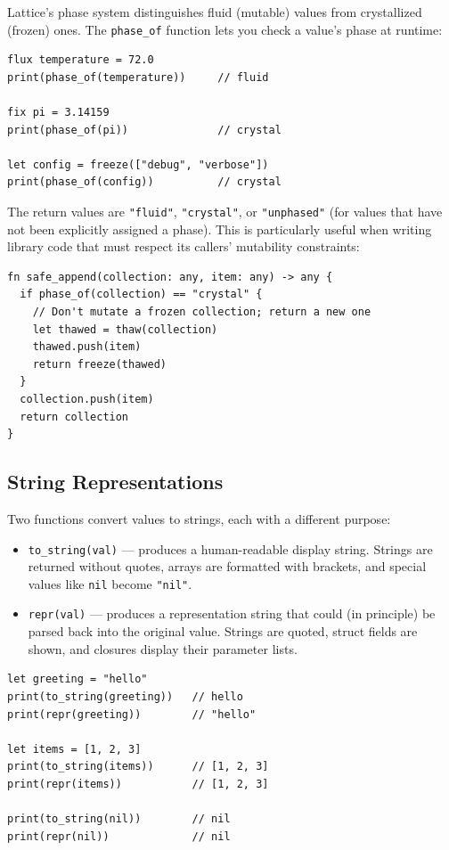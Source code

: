 Lattice's phase system distinguishes fluid (mutable) values from crystallized (frozen) ones.
The \lstinline|phase_of| function lets you check a value's phase at runtime:

\begin{lstlisting}[language=Lattice, caption={Querying value phase}]
flux temperature = 72.0
print(phase_of(temperature))     // fluid

fix pi = 3.14159
print(phase_of(pi))              // crystal

let config = freeze(["debug", "verbose"])
print(phase_of(config))          // crystal
\end{lstlisting}

The return values are \lstinline|"fluid"|, \lstinline|"crystal"|, or \lstinline|"unphased"| (for values that have not been explicitly assigned a phase).
This is particularly useful when writing library code that must respect its callers' mutability constraints:

\begin{lstlisting}[language=Lattice, caption={Respecting caller's phase constraints}]
fn safe_append(collection: any, item: any) -> any {
  if phase_of(collection) == "crystal" {
    // Don't mutate a frozen collection; return a new one
    let thawed = thaw(collection)
    thawed.push(item)
    return freeze(thawed)
  }
  collection.push(item)
  return collection
}
\end{lstlisting}

\subsection{String Representations}

Two functions convert values to strings, each with a different purpose:

\begin{itemize}
  \item \lstinline|to_string(val)| --- produces a human-readable display string.
        Strings are returned without quotes, arrays are formatted with brackets,
        and special values like \lstinline|nil| become \lstinline|"nil"|.
  \item \lstinline|repr(val)| --- produces a representation string that could
        (in principle) be parsed back into the original value. Strings are
        quoted, struct fields are shown, and closures display their parameter
        lists.
\end{itemize}

\begin{lstlisting}[language=Lattice, caption={to\_string vs. repr}]
let greeting = "hello"
print(to_string(greeting))   // hello
print(repr(greeting))        // "hello"

let items = [1, 2, 3]
print(to_string(items))      // [1, 2, 3]
print(repr(items))           // [1, 2, 3]

print(to_string(nil))        // nil
print(repr(nil))             // nil
\end{lstlisting}

